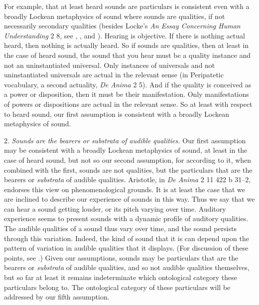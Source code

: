 \documentclass[12pt]{article}
\begin{document}
For example, that at least heard sounds are particulars is consistent even with a broadly Lockean metaphysics of sound where sounds are qualities, if not necessarily secondary qualities (besides Locke's \emph{An Essay Concerning Human Understanding} 2 8, see \citealt{Pasnau:1999ss}, \citealt{Kulvicki:2008aa}, and \citealt{Roberts:2017as}). Hearing is objective. If there is nothing actual heard, then nothing is actually heard. So if sounds are qualities, then at least in the case of heard sound, the sound that you hear must be a quality instance and not an uninstantiated universal. Only instances of universals and not uninstantiated universals are actual in the relevant sense (in Peripatetic vocabulary, a second actuality, \emph{De Anima} 2 5). And if the quality is conceived as a power or disposition, then it must be their manifestation. Only manifestations of powers or dispositions are actual in the relevant sense. So at least with respect to heard sound, our first assumption is consistent with a broadly Lockean metaphysics of sound. 

2. \emph{Sounds are the bearers or \emph{substrata} of audible qualities.} Our first assumption may be consistent with a broadly Lockean metaphysics of sound, at least in the case of heard sound, but not so our second assumption, for according to it, when combined with the first, sounds are not qualities, but the particulars that are the bearers or \emph{substrata} of audible qualities. Aristotle, in \emph{De Anima} 2 11 422 b 31--2, endorses this view on phenomenological grounds. It is at least the case that we are inclined to describe our experience of sounds in this way. Thus we say that we can hear a sound getting louder, or its pitch varying over time. Auditory experience seems to present sounds with a dynamic profile of auditory qualities. The audible qualities of a sound thus vary over time, and the sound persists through this variation. Indeed, the kind of sound that it is can depend upon the pattern of variation in audible qualities that it displays. (For discussion of these points, see \citealt{OCallaghan:2010aa}.) Given our assumptions, sounds may be particulars that are the bearers or \emph{substrata} of audible qualities, and so not audible qualities themselves, but so far at least it remains indeterminate which ontological category these particulars belong to. The ontological category of these particulars will be addressed by our fifth assumption.
\end{document}
